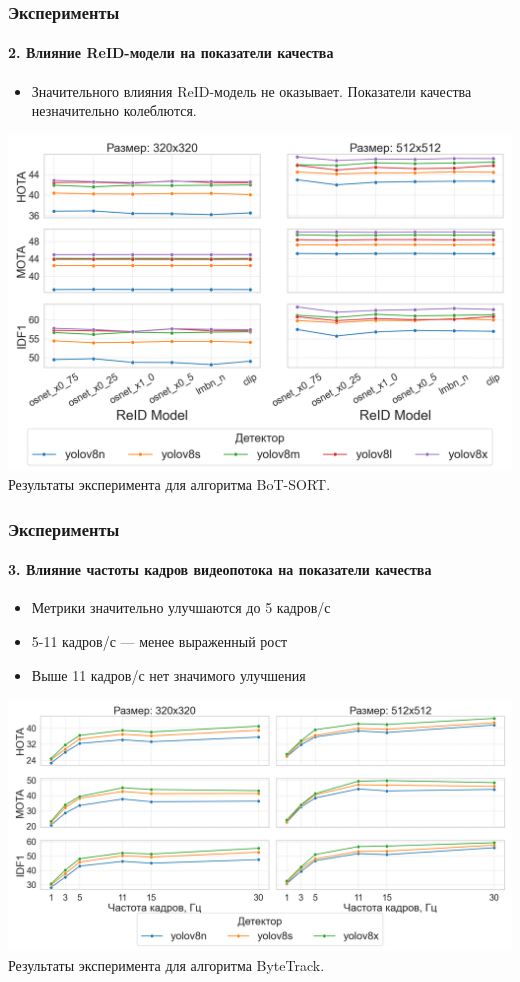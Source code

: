 \documentclass{beamer} %
\begin{document}
\begin{frame}
  \frametitle{Эксперименты}
  \framesubtitle{2. Влияние ReID-модели на показатели качества}
  \begin{itemize}
    \item Значительного влияния ReID-модель не оказывает. Показатели качества незначительно колеблются.
  \end{itemize}
  \centering
  \includegraphics[width=0.7\linewidth]{images/plots/yolo_size_and_reid_vs_metric/BoT-SORT.png}\\
  \small Результаты эксперимента для алгоритма BoT-SORT.
\end{frame}

\begin{frame}
  \frametitle{Эксперименты}
  \framesubtitle{3. Влияние частоты кадров видеопотока на показатели качества}
  \begin{itemize}
    \item Метрики значительно улучшаются до 5 кадров/с
    \item 5-11 кадров/с — менее выраженный рост
    \item Выше 11 кадров/с нет значимого улучшения
  \end{itemize}
  \centering
  \includegraphics[width=0.7\linewidth]{images/plots/fps_vs_metric/ByteTrack.png}\\
  \small Результаты эксперимента для алгоритма ByteTrack.
\end{frame}
\end{document}
